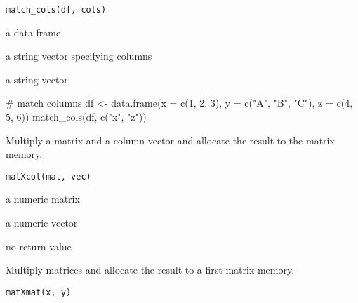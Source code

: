 \documentclass[letterpaper]{book}
\begin{document}
%
\begin{Usage}
\begin{verbatim}
match_cols(df, cols)
\end{verbatim}
\end{Usage}
%
\begin{Arguments}
\begin{ldescription}
\item[\code{df}] a data frame

\item[\code{cols}] a string vector specifying columns
\end{ldescription}
\end{Arguments}
%
\begin{Value}
a string vector
\end{Value}
%
\begin{Examples}
\begin{ExampleCode}
# match columns
df <- data.frame(x = c(1, 2, 3), y = c("A", "B", "C"), z = c(4, 5, 6))
match_cols(df, c("x", "z"))

\end{ExampleCode}
\end{Examples}
%
\begin{Description}
Multiply a matrix and a column vector and allocate the result to the matrix memory.
\end{Description}
%
\begin{Usage}
\begin{verbatim}
matXcol(mat, vec)
\end{verbatim}
\end{Usage}
%
\begin{Arguments}
\begin{ldescription}
\item[\code{mat}] a numeric matrix

\item[\code{vec}] a numeric vector
\end{ldescription}
\end{Arguments}
%
\begin{Value}
no return value
\end{Value}
%
\begin{Description}
Multiply matrices and allocate the result to a first matrix memory.
\end{Description}
%
\begin{Usage}
\begin{verbatim}
matXmat(x, y)
\end{verbatim}
\end{Usage}
\end{document}

